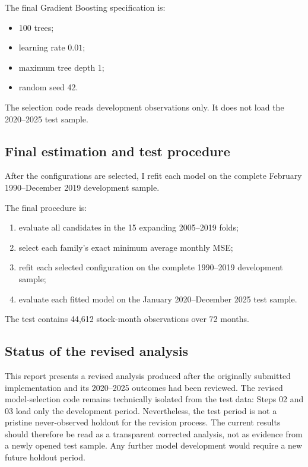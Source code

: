 \documentclass[11pt,a4paper]{article}
\begin{document}
The final Gradient Boosting specification is:

\begin{itemize}
  \item 100 trees;
  \item learning rate \(0.01\);
  \item maximum tree depth 1;
  \item random seed 42.
\end{itemize}

The selection code reads development observations only. It does not load the
2020--2025 test sample.

\subsection{Final estimation and test procedure}

After the configurations are selected, I refit each model on the complete
February 1990--December 2019 development sample.

The final procedure is:

\begin{enumerate}
  \item evaluate all candidates in the 15 expanding 2005--2019 folds;
  \item select each family's exact minimum average monthly MSE;
  \item refit each selected configuration on the complete 1990--2019 development
        sample;
  \item evaluate each fitted model on the January 2020--December 2025
        test sample.
\end{enumerate}

The test contains 44,612 stock-month observations over 72 months.

\subsection{Status of the revised analysis}

This report presents a revised analysis produced after the originally submitted
implementation and its 2020--2025 outcomes had been reviewed. The revised
model-selection code remains technically isolated from the test data: Steps 02
and 03 load only the development period. Nevertheless, the test period is not a
pristine never-observed holdout for the revision process. The current results
should therefore be read as a transparent corrected analysis, not as evidence
from a newly opened test sample. Any further model development would require a
new future holdout period.
\end{document}
